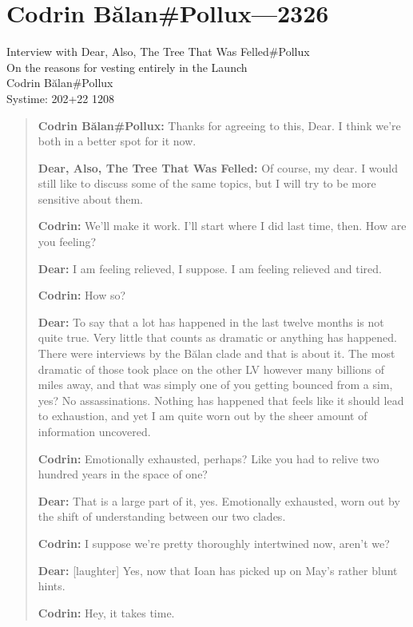 \hypertarget{codrin-bux103lanpollux-2326}{%
\chapter{Codrin Bălan\#Pollux—2326}\label{codrin-bux103lanpollux-2326}}

Interview with Dear, Also, The Tree That Was Felled\#Pollux\\
On the reasons for vesting entirely in the Launch\\
Codrin Bălan\#Pollux\\
Systime: 202+22 1208

\begin{quote}
\textbf{Codrin Bălan\#Pollux:} Thanks for agreeing to this, Dear. I think we're both in a better spot for it now.

\textbf{Dear, Also, The Tree That Was Felled:} Of course, my dear. I would still like to discuss some of the same topics, but I will try to be more sensitive about them.

\textbf{Codrin:} We'll make it work. I'll start where I did last time, then. How are you feeling?

\textbf{Dear:} I am feeling relieved, I suppose. I am feeling relieved and tired.

\textbf{Codrin:} How so?

\textbf{Dear:} To say that a lot has happened in the last twelve months is not quite true. Very little that counts as dramatic or anything has happened. There were interviews by the Bălan clade and that is about it. The most dramatic of those took place on the other LV however many billions of miles away, and that was simply one of you getting bounced from a sim, yes? No assassinations. Nothing has happened that feels like it should lead to exhaustion, and yet I am quite worn out by the sheer amount of information uncovered.

\textbf{Codrin:} Emotionally exhausted, perhaps? Like you had to relive two hundred years in the space of one?

\textbf{Dear:} That is a large part of it, yes. Emotionally exhausted, worn out by the shift of understanding between our two clades.

\textbf{Codrin:} I suppose we're pretty thoroughly intertwined now, aren't we?

\textbf{Dear:} {[}laughter{]} Yes, now that Ioan has picked up on May's rather blunt hints.

\textbf{Codrin:} Hey, it takes time.


\end{quote}
